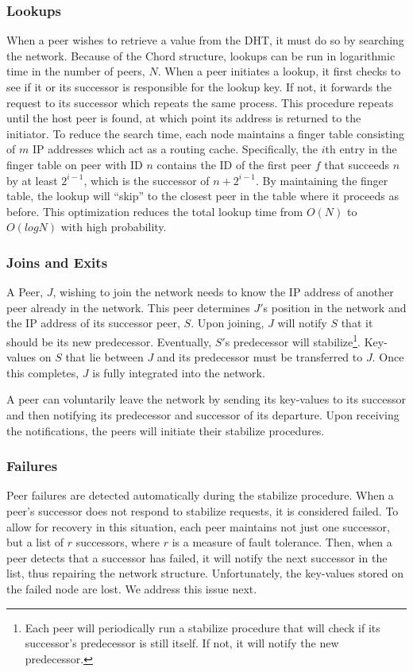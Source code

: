 \documentclass[twocolumn]{article}
\begin{document}
\subsubsection{Lookups}
When a peer wishes to retrieve a value from the DHT, it must do so by searching the network. Because of the Chord structure, lookups can be run in logarithmic time in the number of peers, $N$. When a peer initiates a lookup, it first checks to see if it or its successor is responsible for the lookup key. If not, it forwards the request to its successor which repeats the same process. This procedure repeats until the host peer is found, at which point its address is returned to the initiator. To reduce the search time, each node maintains a finger table consisting of $m$ IP addresses which act as a routing cache. Specifically, the $i$th entry in the finger table on peer with ID $n$ contains the ID of the first peer $f$ that succeeds $n$ by at least $2^{i-1}$, which is the successor of $n+2^{i-1}$. By maintaining the finger table, the lookup will \enquote{skip} to the closest peer in the table where it proceeds as before. This optimization reduces the total lookup time from $O(N)$ to $O(log⁡{N})$ with high probability.

\subsubsection{Joins and Exits}
A Peer, $J$, wishing to join the network needs to know the IP address of another peer already in the network. This peer determines $J'$s position in the network and the IP address of its successor peer, $S$. Upon joining, $J$ will notify $S$ that it should be its new predecessor. Eventually, $S'$s predecessor will stabilize\footnote{Each peer will periodically run a stabilize procedure that will check if its successor's predecessor is still itself. If not, it will notify the new predecessor.}. Key-values on $S$ that lie between $J$ and its predecessor must be transferred to $J$. Once this completes, $J$ is fully integrated into the network.

A peer can voluntarily leave the network by sending its key-values to its successor and then notifying its predecessor and successor of its departure. Upon receiving the notifications, the peers will initiate their stabilize procedures.


\subsubsection{Failures}
Peer failures are detected automatically during the stabilize procedure. When a peer's successor does not respond to stabilize requests, it is considered failed. To allow for recovery in this situation, each peer maintains not just one successor, but a list of $r$ successors, where $r$ is a measure of fault tolerance. Then, when a peer detects that a successor has failed, it will notify the next successor in the list, thus repairing the network structure. Unfortunately, the key-values stored on the failed node are lost. We address this issue next.
\end{document}
